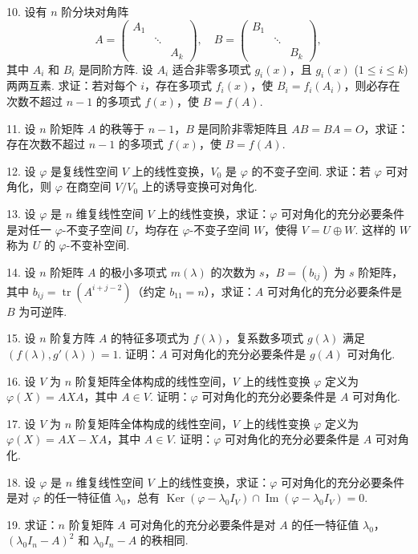\documentclass[UTF8,12pt,a4paper,fontset=fandol]{ctexart}
\begin{document}
10. 设有 $n$ 阶分块对角阵
\[
A=\left(\begin{array}{ccc}
A_1 & & \\
& \ddots & \\
& & A_k
\end{array}\right),\quad
B=\left(\begin{array}{ccc}
B_1 & & \\
& \ddots & \\
& & B_k
\end{array}\right),
\]
其中 $A_i$ 和 $B_i$ 是同阶方阵. 设 $A_i$ 适合非零多项式 $g_i(x)$，且 $g_i(x)$ ($1\leq i\leq k$) 两两互素. 求证：若对每个 $i$，存在多项式 $f_i(x)$，使 $B_i=f_i(A_i)$，则必存在次数不超过 $n-1$ 的多项式 $f(x)$，使 $B=f(A)$.

11. 设 $n$ 阶矩阵 $A$ 的秩等于 $n-1$，$B$ 是同阶非零矩阵且 $AB=BA=O$，求证：存在次数不超过 $n-1$ 的多项式 $f(x)$，使 $B=f(A)$.

12. 设 $\varphi$ 是复线性空间 $V$ 上的线性变换，$V_0$ 是 $\varphi$ 的不变子空间. 求证：若 $\varphi$ 可对角化，则 $\varphi$ 在商空间 $V/V_0$ 上的诱导变换可对角化.

13. 设 $\varphi$ 是 $n$ 维复线性空间 $V$ 上的线性变换，求证：$\varphi$ 可对角化的充分必要条件是对任一 $\varphi$-不变子空间 $U$，均存在 $\varphi$-不变子空间 $W$，使得 $V=U\oplus W$. 这样的 $W$ 称为 $U$ 的 $\varphi$-不变补空间.

14. 设 $n$ 阶矩阵 $A$ 的极小多项式 $m(\lambda)$ 的次数为 $s$，$B=(b_{ij})$ 为 $s$ 阶矩阵，其中 $b_{ij}=\operatorname{tr}(A^{i+j-2})$（约定 $b_{11}=n$），求证：$A$ 可对角化的充分必要条件是 $B$ 为可逆阵.

15. 设 $n$ 阶复方阵 $A$ 的特征多项式为 $f(\lambda)$，复系数多项式 $g(\lambda)$ 满足 $(f(\lambda),g'(\lambda))=1$. 证明：$A$ 可对角化的充分必要条件是 $g(A)$ 可对角化.

16. 设 $V$ 为 $n$ 阶复矩阵全体构成的线性空间，$V$ 上的线性变换 $\varphi$ 定义为 $\varphi(X)=AXA$，其中 $A\in V$. 证明：$\varphi$ 可对角化的充分必要条件是 $A$ 可对角化.

17. 设 $V$ 为 $n$ 阶复矩阵全体构成的线性空间，$V$ 上的线性变换 $\varphi$ 定义为 $\varphi(X)=AX-XA$，其中 $A\in V$. 证明：$\varphi$ 可对角化的充分必要条件是 $A$ 可对角化.

18. 设 $\varphi$ 是 $n$ 维复线性空间 $V$ 上的线性变换，求证：$\varphi$ 可对角化的充分必要条件是对 $\varphi$ 的任一特征值 $\lambda_0$，总有 $\operatorname{Ker}(\varphi-\lambda_0I_V)\cap\operatorname{Im}(\varphi-\lambda_0I_V)=0$.

19. 求证：$n$ 阶复矩阵 $A$ 可对角化的充分必要条件是对 $A$ 的任一特征值 $\lambda_0$，$(\lambda_0I_n-A)^2$ 和 $\lambda_0I_n-A$ 的秩相同.
\end{document}
